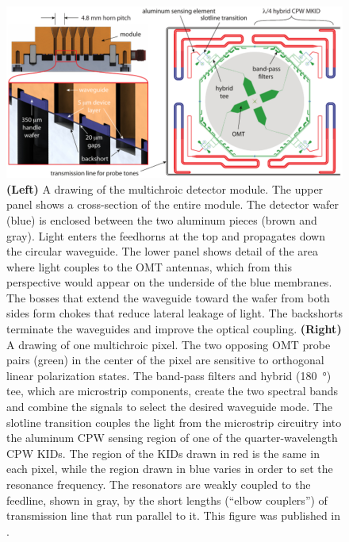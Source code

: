 \begin{figure}[htb]
\centering
\includegraphics[width=\textwidth]{multichroic/multichroic_mkid_coupling_v3.pdf}
\caption[Drawings of the multichroic detector module and of one multichroic pixel.]
{
\textbf{(Left)}
A drawing of the multichroic detector module.
The upper panel shows a cross-section of the entire module.
The detector wafer (blue) is enclosed between the two aluminum pieces (brown and gray).
Light enters the feedhorns at the top and propagates down the circular waveguide.
The lower panel shows detail of the area where light couples to the OMT antennas, which from this perspective would appear on the underside of the blue membranes.
The bosses that extend the waveguide toward the wafer from both sides form chokes that reduce lateral leakage of light.
The backshorts terminate the waveguides and improve the optical coupling.
\textbf{(Right)}
A drawing of one multichroic pixel.
The two opposing OMT probe pairs (green) in the center of the pixel are sensitive to orthogonal linear polarization states.
The band-pass filters and hybrid (\SI{180}{\degree}) tee, which are microstrip components, create the two spectral bands and combine the signals to select the desired waveguide mode.
The slotline transition couples the light from the microstrip circuitry into the aluminum CPW sensing region of one of the quarter-wavelength CPW KIDs.
The region of the KIDs drawn in red is the same in each pixel, while the region drawn in blue varies in order to set the resonance frequency.
The resonators are weakly coupled to the feedline, shown in gray, by the short lengths (``elbow couplers'') of transmission line that run parallel to it.
This figure was published in \textcite{Johnson2017arXiv}.
}
\label{fig:multichroic_mkid_coupling_v3}
\end{figure}

